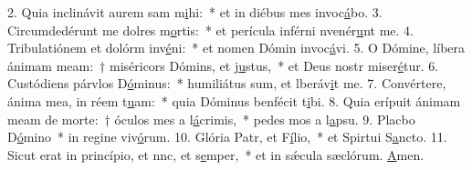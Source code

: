 2. Quia inclinávit aurem sam m\uline{i}hi:~* et in diébus mes invoc\uline{á}bo.
3. Circumdedérunt me dolres m\uline{o}rtis:~* et perícula inférni nvenér\uline{u}nt me.
4. Tribulatiónem et dolórm inv\uline{é}ni:~* et nomen Dómin invoc\uline{á}vi.
5. O Dómine, líbera ánimam meam:~† miséricors Dómins, et j\uline{u}stus,~* et Deus nostr miser\uline{é}tur.
6. Custódiens párvlos D\uline{ó}minus:~* humiliátus sum, et lberáv\uline{i}t me.
7. Convértere, ánima mea, in réem t\uline{u}am:~* quia Dóminus benfécit t\uline{i}bi.
8. Quia erípuit ánimam meam de morte:~† óculos mes a l\uline{á}crimis,~* pedes mos a l\uline{a}psu.
9. Placbo D\uline{ó}mino~* in regine viv\uline{ó}rum.
10. Glória Patr, et F\uline{í}lio,~* et Spirtui S\uline{a}ncto.
11. Sicut erat in princípio, et nnc, et s\uline{e}mper,~* et in sǽcula sæclórum. \uline{A}men.
